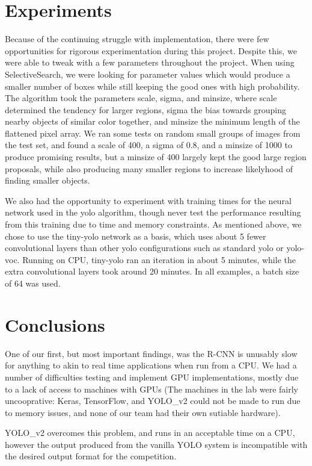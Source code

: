 \documentclass[11pt]{article}
\begin{document}
    \section{Experiments}\label{experiments}

Because of the continuing struggle with implementation, there were few
opportunities for rigorous experimentation during this project. Despite
this, we were able to tweak with a few parameters throughout the
project. When using SelectiveSearch, we were looking for parameter
values which would produce a smaller number of boxes while still keeping
the good ones with high probability. The algorithm took the parameters
scale, sigma, and minsize, where scale determined the tendency for
larger regions, sigma the bias towards grouping nearby objects of
similar color together, and minsize the minimum length of the flattened
pixel array. We ran some tests on random small groups of images from the
test set, and found a scale of 400, a sigma of 0.8, and a minsize of
1000 to produce promising results, but a minsize of 400 largely kept the
good large region proposals, while also producing many smaller regions
to increase likelyhood of finding smaller objects.

We also had the opportunity to experiment with training times for the
neural network used in the yolo algorithm, though never test the
performance resulting from this training due to time and memory
constraints. As mentioned above, we chose to use the tiny-yolo network
as a basis, which uses about 5 fewer convolutional layers than other
yolo configurations such as standard yolo or yolo-voc. Running on CPU,
tiny-yolo ran an iteration in about 5 minutes, while the extra
convolutional layers took around 20 minutes. In all examples, a batch
size of 64 was used.

    \section{Conclusions}\label{conclusions}

One of our first, but most important findings, was the R-CNN is unusably
slow for anything to akin to real time applications when run from a CPU.
We had a number of difficulties testing and implement GPU
implementations, mostly due to a lack of access to machines with GPUs
(The machines in the lab were fairly uncooprative: Keras, TensorFlow,
and YOLO\_v2 could not be made to run due to memory issues, and none of
our team had their own sutiable hardware).

YOLO\_v2 overcomes this problem, and runs in an acceptable time on a
CPU, however the output produced from the vanilla YOLO system is
incompatible with the desired output format for the competition.
\end{document}
